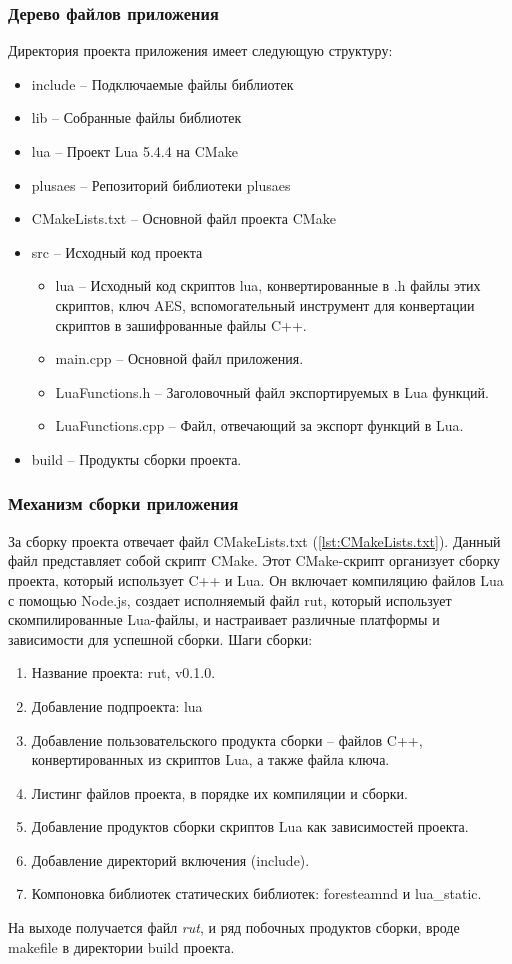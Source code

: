 \subsubsection{Дерево файлов приложения}
Директория проекта приложения имеет следующую структуру:
\begin{itemize}
	\item include -- Подключаемые файлы библиотек
	\item lib -- Собранные файлы библиотек
	\item lua -- Проект Lua 5.4.4 на CMake
	\item plusaes -- Репозиторий библиотеки plusaes
	\item CMakeLists.txt -- Основной файл проекта CMake
	\item src -- Исходный код проекта
	\begin{itemize}
		\item lua -- Исходный код скриптов lua, конвертированные в .h файлы этих скриптов, ключ AES, вспомогательный инструмент для конвертации скриптов в зашифрованные файлы C++.
		\item main.cpp -- Основной файл приложения.
		\item LuaFunctions.h -- Заголовочный файл экспортируемых в Lua функций.
		\item LuaFunctions.cpp -- Файл, отвечающий за экспорт функций в Lua.
	\end{itemize}
	\item build -- Продукты сборки проекта.
\end{itemize}

\subsubsection{Механизм сборки приложения}
За сборку проекта отвечает файл CMakeLists.txt (\autoref{lst:CMakeLists.txt}). Данный файл представляет собой скрипт CMake. Этот CMake-скрипт организует сборку проекта, который использует C++ и Lua. Он включает компиляцию файлов Lua с помощью Node.js, создает исполняемый файл rut, который использует скомпилированные Lua-файлы, и настраивает различные платформы и зависимости для успешной сборки. Шаги сборки:
\begin{enumerate}
	\item Название проекта: rut, v0.1.0.
	\item Добавление подпроекта: lua
	\item Добавление пользовательского продукта сборки -- файлов C++, конвертированных из скриптов Lua, а также файла ключа.
	\item Листинг файлов проекта, в порядке их компиляции и сборки.
	\item Добавление продуктов сборки скриптов Lua как зависимостей проекта.
	\item Добавление директорий включения (include).
	\item Компоновка библиотек статических библиотек: foresteamnd и lua\_static.
\end{enumerate}
На выходе получается файл \textit{rut}, и ряд побочных продуктов сборки, вроде makefile в директории build проекта.

\clearpage